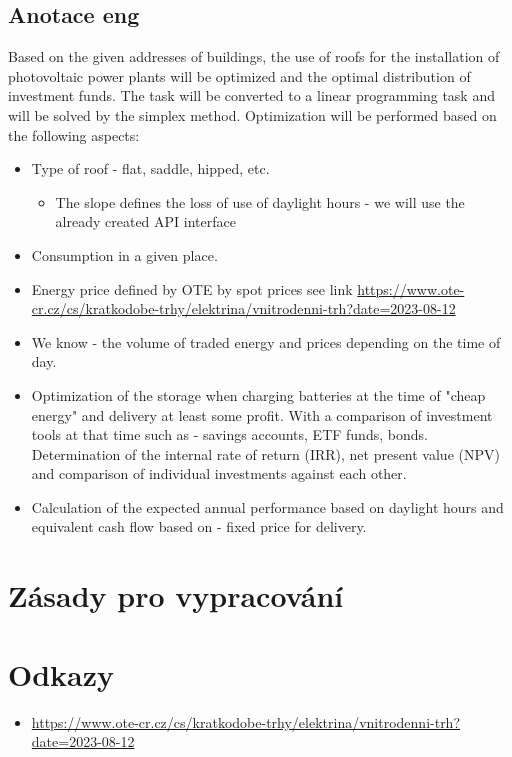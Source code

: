 \documentclass[a4paper, 12pt]{article}
\begin{document}
\subsection*{Anotace eng}
Based on the given addresses of buildings, the use of roofs for the installation of photovoltaic power plants will be optimized and the optimal distribution of investment funds. The task will be converted to a linear programming task and will be solved by the simplex method. Optimization will be performed based on the following aspects:
\begin{itemize}

    \item Type of roof - flat, saddle, hipped, etc.
          \begin{itemize}
              \item The slope defines the loss of use of daylight hours - we will use the already created API interface
          \end{itemize}
    \item Consumption in a given place.
    \item Energy price defined by OTE by spot prices see link \url{https://www.ote-cr.cz/cs/kratkodobe-trhy/elektrina/vnitrodenni-trh?date=2023-08-12}
    \item We know - the volume of traded energy and prices depending on the time of day.
    \item Optimization of the storage when charging batteries at the time of "cheap energy" and delivery at least some profit. With a comparison of investment tools at that time such as - savings accounts, ETF funds, bonds. Determination of the internal rate of return (IRR), net present value (NPV) and comparison of individual investments against each other.
    \item Calculation of the expected annual performance based on daylight hours and equivalent cash flow based on - fixed price for delivery.

\end{itemize}

\section{Zásady pro vypracování}

    
\section{Odkazy}

\begin{itemize}
    \item \url{https://www.ote-cr.cz/cs/kratkodobe-trhy/elektrina/vnitrodenni-trh?date=2023-08-12}
\end{itemize}
\end{document}
